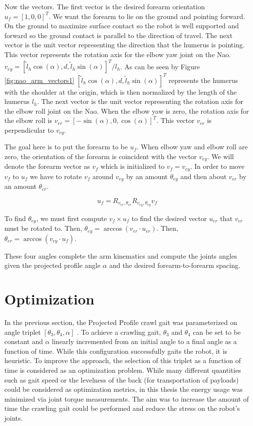 Now the vectors.
The first vector is the desired forearm orientation $u_f = [1, 0, 0]^T$. We want the forearm to lie on the ground
and pointing forward. On the ground to maximize surface contact so the robot is well supported and forward so the
ground contact is parallel to the direction of travel.
The next vector is the unit vector representing the direction that the humerus is pointing.
This vector represents the rotation axis for the elbow yaw joint on the Nao.
$v_{ey} = [\tilde l_h \cos(\alpha), d, \tilde l_h \sin(\alpha)]^T / l_h$.
As can be seen by Figure \ref{fig:nao_arm_vectors1} $[\tilde l_h \cos(\alpha), d, \tilde l_h \sin(\alpha)]^T$ represents
the humerus with the shoulder at the origin, which is then normalized by the length of the humerus $l_h$.
The next vector is the unit vector representing the rotation axis for the elbow roll joint on the Nao.
When the elbow yaw is zero, the rotation axis for the elbow roll is $v_{er} = [-\sin(\alpha), 0, \cos(\alpha)]^T$.
This vector $v_{er}$ is perpendicular to $v_{ey}$.

The goal here is to put the forearm to be $u_f$. When elbow yaw and elbow roll are zero, the orientation of the
forearm is coincident with the vector $v_{ey}$. We will denote the forearm vector as $v_f$ which is initialized to
$v_f = v_{ey}$.
In order to move $v_f$ to $u_f$ we have to rotate $v_f$ around $v_{ey}$ by an amount $\theta_{ey}$ and then about
$v_{er}$ by an amount $\theta_{er}$.

\begin{equation}
	u_f = R_{v_{er}, \theta_{er}} R_{v_{ey}, \theta_{ey}} v_f
\end{equation}

To find $\theta_{ey}$, we must first compute $v_f \times u_f$ to find the desired vector $u_{er}$ that
$v_{er}$ must be rotated to. Then, $\theta_{ey} = \arccos(v_{er} \cdot u_{er})$.
Then, $\theta_{er} = \arccos(v_{ey} \cdot u_f)$.

These four angles complete the arm kinematics and compute the joints angles given the projected profile angle $\alpha$
and the desired forearm-to-forearm spacing.

\section{Optimization}

In the previous section, the Projected Profile crawl gait was parameterized on angle triplet $[ \theta_3, \theta_4, \alpha ]$ .
To achieve a crawling gait, $\theta_3$ and $\theta_4$ can be set to be constant and $\alpha$ linearly incremented
from an initial angle to a final angle as a function of time. While this configuration successfully gaits the robot,
it is heuristic. To improve the approach, the selection of this triplet as a function of time is considered as an optimization 
problem. While many different quantities such as gait speed or the levelness of the back (for transportation of payloads) could
be considered as optimization metrics, in this thesis the energy usage was minimized via joint torque measurements.
The aim was to increase the amount of time the crawling gait could be performed and reduce the stress on the robot's joints.

